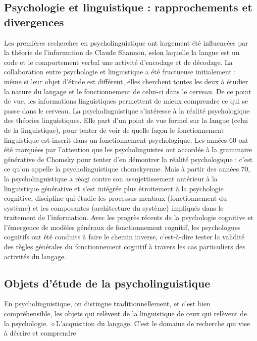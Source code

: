 \subsection{Psychologie et linguistique : rapprochements et divergences}
Les premières recherches en psycholinguistique ont largement été influencées par la théorie de
l'information de Claude Shannon, selon laquelle la langue est un code et le comportement verbal une
activité d'encodage et de décodage. La collaboration entre psychologie et linguistique a été fructueuse
initialement : même si leur objet d'étude est différent, elles cherchent toutes les deux à étudier la nature
du langage et le fonctionnement de celui-ci dans le cerveau. De ce point de vue, les informations
linguistiques permettent de mieux comprendre ce qui se passe dans le cerveau.
La psycholinguistique s'intéresse à la réalité psychologique des théories linguistiques. Elle part d'un
point de vue formel sur la langue (celui de la linguistique), pour tenter de voir de quelle façon le
fonctionnement linguistique est inscrit dans un fonctionnement psychologique. Les années 60 ont été
marquées par l'attention que les psycholinguistes ont accordée à la grammaire générative de Chomsky
pour tenter d’en démontrer la réalité psychologique : c’est ce qu’on appelle la psycholinguistique
chomskyenne. Mais à partir des années 70, la psycholinguistique a réagi contre son assujettissement
antérieur à la linguistique générative et s’est intégrée plus étroitement à la psychologie cognitive,
discipline qui étudie les processus mentaux (fonctionnement du système) et les composantes
(architecture du système) impliqués dans le traitement de l'information. Avec les progrès récents
de la psychologie cognitive et l'émergence de modèles généraux de fonctionnement cognitif, les
psychologues cognitifs ont été conduits à faire le chemin inverse, c'est-à-dire tester la validité des
règles générales du fonctionnement cognitif à travers les cas particuliers des activités du langage.
\subsection{Objets d’étude de la psycholinguistique}
En psycholinguistique, on distingue traditionnellement, et c'est bien compréhensible, les objets qui
relèvent de la linguistique de ceux qui relèvent de la psychologie.
\noindent\textcolor{BellaTeal}{$\diamond$}\enspace L'acquisition du langage. C'est le domaine de recherche qui vise à décrire et comprendre\par

